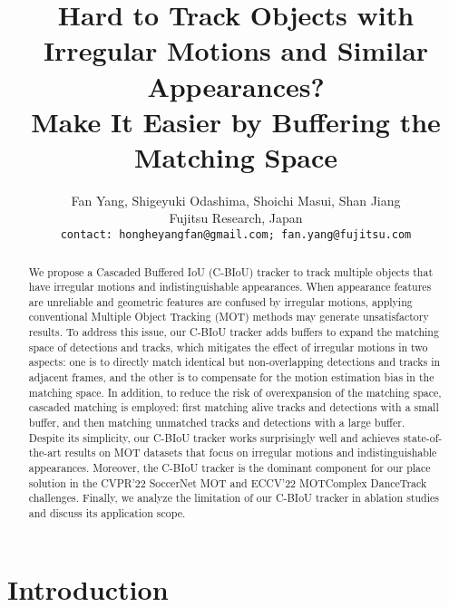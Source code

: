 \documentclass[journal]{IEEEtran}
\begin{document}
\title{Hard to Track Objects with Irregular Motions and Similar Appearances? \\Make It Easier by Buffering the Matching Space }




\author{
Fan Yang, Shigeyuki Odashima, Shoichi Masui, Shan Jiang\\
Fujitsu Research, Japan\\
{\tt\small contact: hongheyangfan@gmail.com; fan.yang@fujitsu.com}
}
\maketitle
\thispagestyle{empty}

\begin{abstract}

   We propose a Cascaded Buffered IoU (C-BIoU) tracker to track multiple objects that have irregular motions and indistinguishable appearances. When appearance features are unreliable and geometric features are confused by irregular motions, applying conventional Multiple Object Tracking (MOT) methods may generate unsatisfactory results. To address this issue, our C-BIoU tracker adds buffers to expand the matching space of detections and tracks, which mitigates the effect of irregular motions in two aspects: one is to directly match identical but non-overlapping detections and tracks in adjacent frames, and the other is to compensate for the motion estimation bias in the matching space. In addition, to reduce the risk of overexpansion of the matching space, cascaded matching is employed: first matching alive tracks and detections with a small buffer, and then matching unmatched tracks and detections with a large buffer. Despite its simplicity, our C-BIoU tracker works surprisingly well and achieves state-of-the-art results on MOT datasets that focus on irregular motions and indistinguishable appearances. Moreover, the C-BIoU tracker is the dominant component for our  place solution in the CVPR'22 SoccerNet MOT and ECCV'22 MOTComplex DanceTrack challenges. Finally, we analyze the limitation of our C-BIoU tracker in ablation studies and discuss its application scope.

\end{abstract}






\section{Introduction}
\end{document}
